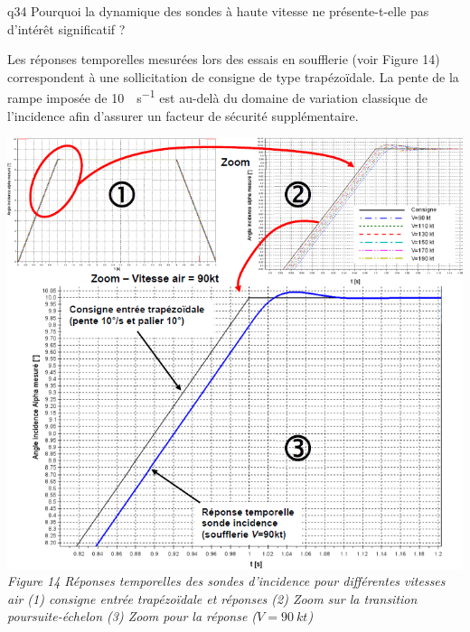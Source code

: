 \begin{multicols}{2}
{\begin{question}{q34}
Pourquoi la dynamique des sondes à haute vitesse ne présente-t-elle pas d’intérêt
significatif ?
\ifprof
\begin{corrige}
\end{corrige}
\else
\fi
\begin{reponses}
\end{reponses} \end{question}}  

Les réponses temporelles mesurées lors des essais en soufflerie (voir Figure 14) correspondent à une
sollicitation de consigne de type trapézoïdale. La pente de la rampe imposée de \SI{10}{\degres.s^{-1}} est au-delà du
domaine de variation classique de l’incidence afin d’assurer un facteur de sécurité supplémentaire.


\begin{center}
\includegraphics[width=\linewidth]{images/fig_17}
\textit{Figure 14 Réponses temporelles des sondes d'incidence pour différentes vitesses air (1) consigne entrée trapézoïdale et réponses (2) Zoom sur la transition poursuite-échelon (3) Zoom pour la réponse ($V=\SI{90}{kt}$)}
\end{center}


\end{multicols}
